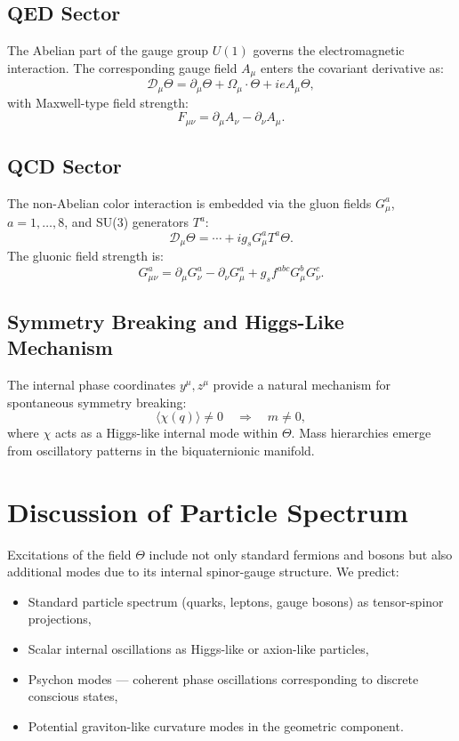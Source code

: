 \documentclass[12pt]{article}
\begin{document}
\subsection{QED Sector}

The Abelian part of the gauge group \( U(1) \) governs the electromagnetic interaction. The corresponding gauge field \( A_\mu \) enters the covariant derivative as:
\[
\mathcal{D}_\mu \Theta = \partial_\mu \Theta + \Omega_\mu \cdot \Theta + i e A_\mu \Theta,
\]
with Maxwell-type field strength:
\[
F_{\mu\nu} = \partial_\mu A_\nu - \partial_\nu A_\mu.
\]

\subsection{QCD Sector}

The non-Abelian color interaction is embedded via the gluon fields \( G_\mu^a \), \( a=1,\dots,8 \), and SU(3) generators \( T^a \):
\[
\mathcal{D}_\mu \Theta = \cdots + i g_s G_\mu^a T^a \Theta.
\]
The gluonic field strength is:
\[
G_{\mu\nu}^a = \partial_\mu G_\nu^a - \partial_\nu G_\mu^a + g_s f^{abc} G_\mu^b G_\nu^c.
\]

\subsection{Symmetry Breaking and Higgs-Like Mechanism}

The internal phase coordinates \( y^\mu, z^\mu \) provide a natural mechanism for spontaneous symmetry breaking:
\[
\langle \chi(q) \rangle \neq 0 \quad \Rightarrow \quad m \neq 0,
\]
where \( \chi \) acts as a Higgs-like internal mode within \( \Theta \). Mass hierarchies emerge from oscillatory patterns in the biquaternionic manifold.

\section{Discussion of Particle Spectrum}

Excitations of the field \( \Theta \) include not only standard fermions and bosons but also additional modes due to its internal spinor-gauge structure. We predict:

\begin{itemize}
  \item Standard particle spectrum (quarks, leptons, gauge bosons) as tensor-spinor projections,
  \item Scalar internal oscillations as Higgs-like or axion-like particles,
  \item Psychon modes — coherent phase oscillations corresponding to discrete conscious states,
  \item Potential graviton-like curvature modes in the geometric component.
\end{itemize}
\end{document}
